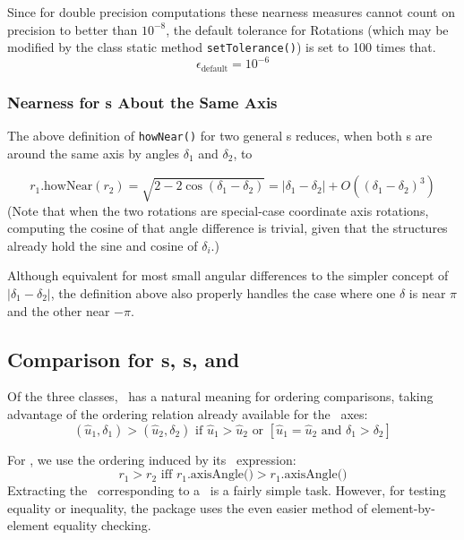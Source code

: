 Since for double precision computations these nearness measures cannot 
count on precision to better than $10^{-8}$, 
the default tolerance for Rotations 
(which may be modified by the class static method {\tt setTolerance()}) 
is set to 100 times that.
\begin{equation}
  \epsilon_{\mbox{default}} =  10^{-6}
\label{eq:epsildefR}
\end{equation}

\subsubsection{Nearness for \protect\Ro s About the Same Axis}
\label{rotsame}

The above definition of {\tt howNear()} for two general \Rotation s reduces,
when both \Rotation s are around the same axis by angles $\delta_1$ and
$\delta_2$, to

\begin{equation}
 r_1 \mbox{.howNear} (r_2) = \sqrt{ 2 - 2 \cos (\delta_1 - \delta_2) }
 = | \delta_1 - \delta_2 | + O \left( (\delta_1 - \delta_2)^3 \right)
\end{equation}
\noindent
(Note that when the two rotations are special-case coordinate axis rotations,
computing the cosine of that angle difference is trivial, given
that the structures already hold the sine and cosine of $\delta_i$.)

Although equivalent for most small angular differences to the simpler concept
of $ | \delta_1 - \delta_2 | $, the definition above also properly handles the
case where one $\delta$ is near $\pi$ and the other near $-\pi$.

\subsection{Comparison for \protect\Ro s, \protect\Ax s, and \protect\Es\ }

Of the three classes, \Ax\ has a natural meaning for ordering comparisons,
taking advantage of the ordering relation already available for the \UV\
axes:
\begin{equation}
\label{eq:ordrot}
  ( \hat{u}_1 , \delta_1 ) > ( \hat{u}_2 , \delta_2 ) \mbox{ if }
	\hat{u}_1 > \hat{u}_2  \mbox { or } \left[
	\hat{u}_1 = \hat{u}_2  \mbox { and }
	\delta_1 > \delta_2  \right]
\end{equation}

For \Rotation, we use the ordering induced by its \Ax\ expression:
\begin{equation}
  r_1 > r_2 \mbox{ iff } r_1 \mbox{.axisAngle()} > r_1 \mbox{.axisAngle()}
\end{equation}
\noindent
Extracting the \Ax\ corresponding to a \Ro\ is a fairly simple task.  
However, for testing equality or inequality, the package uses the even
easier method of element-by-element equality checking.

